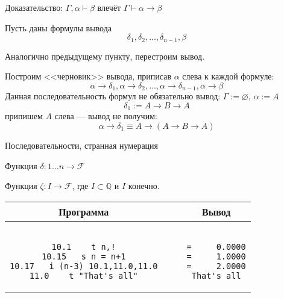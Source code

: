 \documentclass[aspectratio=169]{beamer}
\begin{document}
\begin{frame}{Доказательство: $\Gamma,\alpha\vdash\beta$ влечёт $\Gamma\vdash\alpha\rightarrow\beta$}

Пусть даны формулы вывода $$\delta_1,\delta_2,\dots,\delta_{n-1},\beta$$

Аналогично предыдущему пункту, перестроим вывод.\pause

Построим <<черновик>> вывода, приписав $\alpha$ слева к каждой формуле:
$$\alpha\rightarrow\delta_1,\alpha\rightarrow\delta_2,\dots,\alpha\rightarrow\delta_{n-1},\alpha\rightarrow\beta$$\pause
Данная последовательность формул не обязательно вывод: $\Gamma:=\varnothing$, $\alpha := A$
$$\delta_1 := A\rightarrow B\rightarrow A$$\pause
припишем $A$ слева --- вывод не получим:
$$\alpha\rightarrow\delta_1 \equiv A \rightarrow (A\rightarrow B\rightarrow A)$$
\end{frame}

\begin{frame}[fragile]{Последовательности, странная нумерация}

\begin{defrus}
Функция $\delta: 1\dots n \rightarrow \mathcal{F}$
\end{defrus}

\begin{defrus}
Функция $\zeta: I \rightarrow \mathcal{F}$, где $I \subset \mathbb{Q}$ и $I$ конечно.
\end{defrus}

\begin{exmprus}
\begin{tabular}{cp{1cm}|p{1cm}c}Программа &&& Вывод \\\hline
\begin{minipage}{0.4\textwidth}
\begin{verbatim}

10.1    t n,!
10.15   s n = n+1
10.17   i (n-3) 10.1,11.0,11.0
11.0    t "That's all"
\end{verbatim}
\end{minipage}
&&&
\begin{minipage}{0.3\textwidth}
\begin{verbatim}

=     0.0000
=     1.0000
=     2.0000
That's all
\end{verbatim}
\end{minipage}
\end{tabular}
\end{exmprus}
\end{frame}
\end{document}
